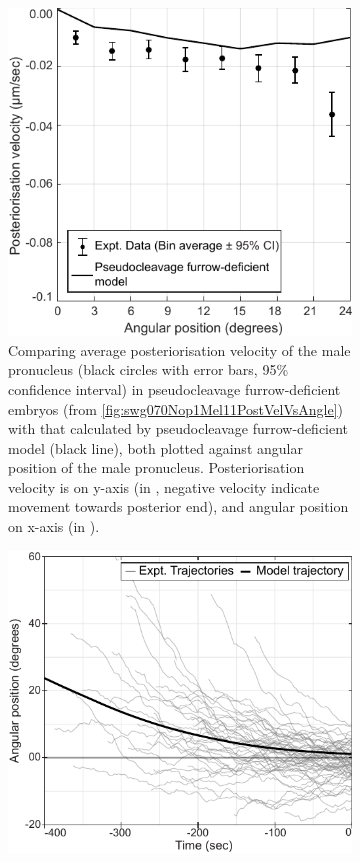 \begin{figure}
    \centering
    \begin{subfigure}[t]{0.45\textwidth}
        \includegraphics[width=\textwidth]{Results/FigComparePCF/nopMelPostVelModel.pdf}
        \caption{Comparing average posteriorisation velocity of the male pronucleus (black circles with error bars, \num{95}\% confidence interval) in pseudocleavage furrow-deficient embryos (from \autoref{fig:swg070Nop1Mel11PostVelVsAngle}) with that calculated by pseudocleavage furrow-deficient model (black line), both plotted against angular position of the male pronucleus. Posteriorisation velocity is on y-axis (in \si{\unitPostVel}, negative velocity indicate movement towards posterior end), and angular position on x-axis (in \si{\unitAngle}).}
        \label{subfig:pcfRemoveModelCompareExpt-postVel}
    \end{subfigure}
    \hfill
    \begin{subfigure}[t]{0.45\textwidth}
        \includegraphics[width=\textwidth]{Results/FigComparePCF/wtTrajectoriesModel.pdf}

\end{subfigure}
\end{figure}
